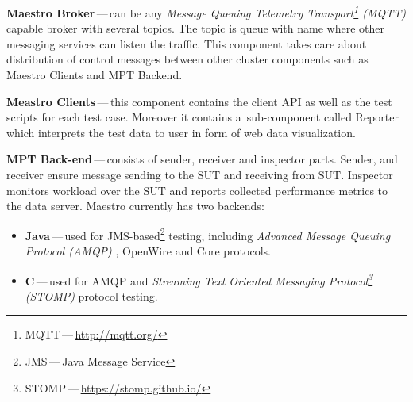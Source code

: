 \begin{description}
	\setlength\itemsep{0em}
	\item \textbf{Maestro Broker}\,---\,can be any \emph{Message Queuing Telemetry Transport\footnote{MQTT\,---\,\url{http://mqtt.org/}} (MQTT)} capable broker with several topics. The topic is queue with name where other messaging services can listen the traffic. This component takes care about distribution of control messages between other cluster components such as Maestro Clients and MPT Backend.
	\item \textbf{Meastro Clients}\,---\,this component contains the client API as well as the test scripts for each test case. Moreover it contains a~sub-component called Reporter which interprets the test data to user in form of web data visualization.
	\item \textbf{MPT Back-end}\,---\,consists of sender, receiver and inspector parts. Sender, and receiver ensure message sending to the SUT and receiving from SUT. Inspector monitors workload over the SUT and reports collected performance metrics to the data server. Maestro currently has two backends:
	\begin{itemize}
		\item \textbf{Java}\,---\,used for JMS-based\footnote{JMS\,---\,Java Message Service} testing, including \emph{Advanced Message Queuing Protocol (AMQP)} \cite{OASIS:AMQP}, OpenWire and Core protocols.
		\item \textbf{C}\,---\,used for AMQP and \emph{Streaming Text Oriented Messaging Protocol\footnote{STOMP\,---\,\url{https://stomp.github.io/}} (STOMP)} protocol testing.
	\end{itemize}
\end{description}

